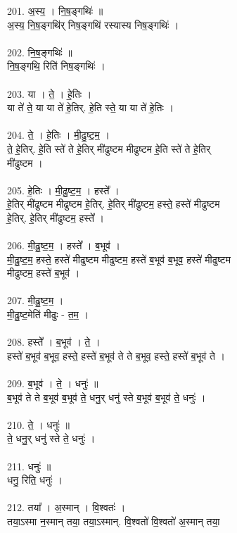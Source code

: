 201. अ॒स्य॒ । नि॒ष॒ङ्गथिः॑ ॥\\
अ॒स्य॒ नि॒ष॒ङ्गथि॑र् निष॒ङ्गथि॑ रस्यास्य निष॒ङ्गथिः॑ ।\\
\\
202. नि॒ष॒ङ्गथिः॑ ॥\\
नि॒ष॒ङ्गथि॒ रिति॑ निष॒ङ्गथिः॑ ।\\
\\
203. या । ते॒ । हे॒तिः ।\\
या ते॑ ते॒ या या ते॑ हे॒तिर्. हे॒ति स्ते॒ या या ते॑ हे॒तिः ।\\
\\
204. ते॒ । हे॒तिः । मी॒ढु॒ष्ट॒म॒ ।\\
ते॒ हे॒तिर्. हे॒ति स्ते॑ ते हे॒तिर् मी॑ढुष्टम मीढुष्टम हे॒ति स्ते॑ ते हे॒तिर्\\
मी॑ढुष्टम ।\\
\\
205. हे॒तिः । मी॒ढु॒ष्ट॒म॒ । हस्ते᳚ ।\\
हे॒तिर् मी॑ढुष्टम मीढुष्टम हे॒तिर्. हे॒तिर् मी॑ढुष्टम॒ हस्ते॒ हस्ते॑ मीढुष्टम\\
हे॒तिर्. हे॒तिर् मी॑ढुष्टम॒ हस्ते᳚ ।\\
\\
206. मी॒ढु॒ष्ट॒म॒ । हस्ते᳚ । ब॒भूव॑ ।\\
मी॒ढु॒ष्ट॒म॒ हस्ते॒ हस्ते॑ मीढुष्टम मीढुष्टम॒ हस्ते॑ ब॒भूव॑ ब॒भूव॒ हस्ते॑ मीढुष्टम\\
मीढुष्टम॒ हस्ते॑ ब॒भूव॑ ।\\
\\
207. मी॒ढु॒ष्ट॒म॒ ।\\
मी॒ढु॒ष्ट॒मेति॑ मीढुः - त॒म॒ ।\\
\\
208. हस्ते᳚ । ब॒भूव॑ । ते॒ ।\\
हस्ते॑ ब॒भूव॑ ब॒भूव॒ हस्ते॒ हस्ते॑ ब॒भूव॑ ते ते ब॒भूव॒ हस्ते॒ हस्ते॑ ब॒भूव॑ ते ।\\
\\
209. ब॒भूव॑ । ते॒ । धनुः॑ ॥\\
ब॒भूव॑ ते ते ब॒भूव॑ ब॒भूव॑ ते॒ धनु॒र् धनु॑ स्ते ब॒भूव॑ ब॒भूव॑ ते॒ धनुः॑ ।\\
\\
210. ते॒ । धनुः॑ ॥\\
ते॒ धनु॒र् धनु॑ स्ते ते॒ धनुः॑ ।\\
\\
211. धनुः॑ ॥\\
धनु॒ रिति॒ धनुः॑ ।\\
\\
212. तया᳚ । अ॒स्मान् । वि॒श्वतः॑ ।\\
तया॒ऽस्मा न॒स्मान् तया॒ तया॒ऽस्मान्. वि॒श्वतो॑ वि॒श्वतो॑ अ॒स्मान् तया॒\\
